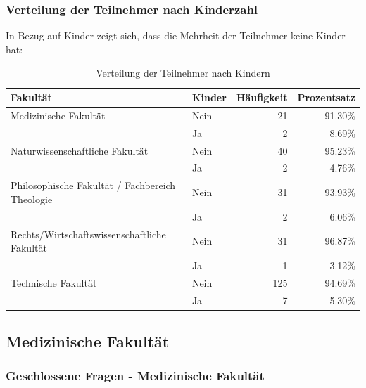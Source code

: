 \documentclass[german,report]{i1thesis}
\begin{document}
\subsubsection{Verteilung der Teilnehmer nach Kinderzahl}
In Bezug auf Kinder zeigt sich, dass die Mehrheit der Teilnehmer keine Kinder hat:

\begin{table}[H]
\centering
\begin{tabular}{|l|l|r|r|}
\hline
\textbf{Fakultät} & \textbf{Kinder} & \textbf{Häufigkeit} & \textbf{Prozentsatz} \\ \hline
Medizinische Fakultät & Nein & 21 & 91.30\% \\ \cline{2-4}
 & Ja & 2 & 8.69\% \\ \hline
Naturwissenschaftliche Fakultät & Nein & 40 & 95.23\% \\ \cline{2-4}
 & Ja & 2 & 4.76\% \\ \hline
Philosophische Fakultät / Fachbereich Theologie & Nein & 31 & 93.93\% \\ \cline{2-4}
 & Ja & 2 & 6.06\% \\ \hline
Rechts/Wirtschaftswissenschaftliche Fakultät & Nein & 31 & 96.87\% \\ \cline{2-4}
 & Ja & 1 & 3.12\% \\ \hline
Technische Fakultät & Nein & 125 & 94.69\% \\ \cline{2-4}
 & Ja & 7 & 5.30\% \\ \hline
\end{tabular}
\caption{Verteilung der Teilnehmer nach Kindern}
\end{table}

\subsection{Medizinische Fakultät}

\subsubsection{Geschlossene Fragen - Medizinische Fakultät}
\end{document}
